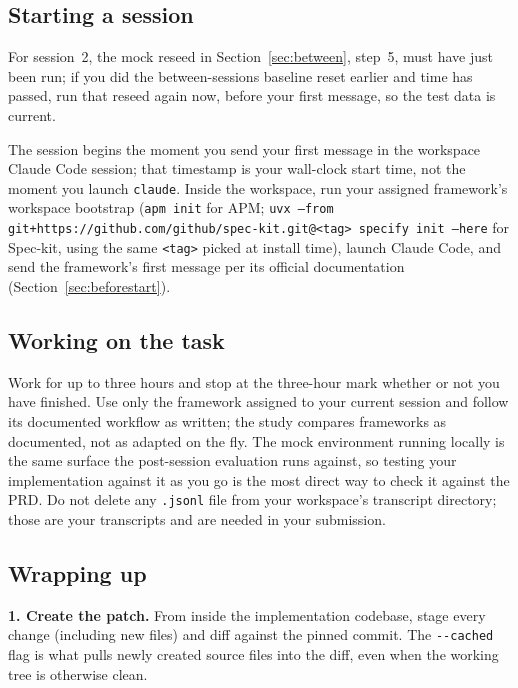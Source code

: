 \documentclass[11pt, a4paper]{article}
\begin{document}
\subsection{Starting a session}
\label{sec:starting}

For session~2, the mock reseed in Section~\ref{sec:between}, step~5, must have just been run; if you did the between-sessions baseline reset earlier and time has passed, run that reseed again now, before your first message, so the test data is current.

The session begins the moment you send your first message in the workspace Claude Code session; that timestamp is your wall-clock start time, not the moment you launch \texttt{claude}. Inside the workspace, run your assigned framework's workspace bootstrap (\texttt{apm init} for APM; \texttt{uvx --from git+https://github.com/github/spec-kit.git@<tag> specify init --here} for Spec-kit, using the same \texttt{<tag>} picked at install time), launch Claude Code, and send the framework's first message per its official documentation (Section~\ref{sec:beforestart}).

\subsection{Working on the task}
\label{sec:working}

Work for up to three hours and stop at the three-hour mark whether or not you have finished. Use only the framework assigned to your current session and follow its documented workflow as written; the study compares frameworks as documented, not as adapted on the fly. The mock environment running locally is the same surface the post-session evaluation runs against, so testing your implementation against it as you go is the most direct way to check it against the PRD. Do not delete any \texttt{.jsonl} file from your workspace's transcript directory; those are your transcripts and are needed in your submission.

\subsection{Wrapping up}
\label{sec:wrapping}

\textbf{1. Create the patch.} From inside the implementation codebase, stage every change (including new files) and diff against the pinned commit. The \texttt{-{}-cached} flag is what pulls newly created source files into the diff, even when the working tree is otherwise clean.
\end{document}
